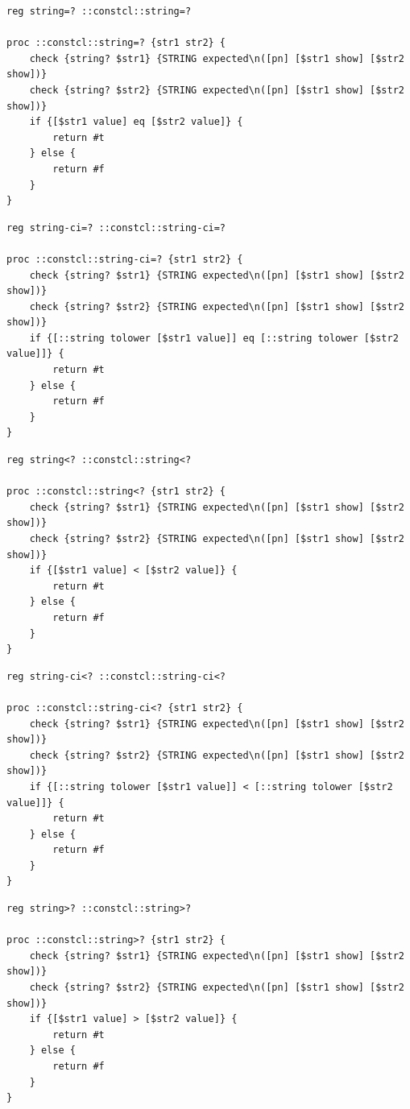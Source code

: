 \documentclass[twoside,9pt]{report}
\begin{document}
\noindent\makebox[\linewidth]{\rule{\linewidth}{0.4pt}}
\begin{lstlisting}
reg string=? ::constcl::string=?
 
proc ::constcl::string=? {str1 str2} {
    check {string? $str1} {STRING expected\n([pn] [$str1 show] [$str2 show])}
    check {string? $str2} {STRING expected\n([pn] [$str1 show] [$str2 show])}
    if {[$str1 value] eq [$str2 value]} {
        return #t
    } else {
        return #f
    }
}
\end{lstlisting}
\noindent\makebox[\linewidth]{\rule{\linewidth}{0.4pt}}
\noindent\makebox[\linewidth]{\rule{\linewidth}{0.4pt}}
\begin{lstlisting}
reg string-ci=? ::constcl::string-ci=?
 
proc ::constcl::string-ci=? {str1 str2} {
    check {string? $str1} {STRING expected\n([pn] [$str1 show] [$str2 show])}
    check {string? $str2} {STRING expected\n([pn] [$str1 show] [$str2 show])}
    if {[::string tolower [$str1 value]] eq [::string tolower [$str2 value]]} {
        return #t
    } else {
        return #f
    }
}
\end{lstlisting}
\noindent\makebox[\linewidth]{\rule{\linewidth}{0.4pt}}
\noindent\makebox[\linewidth]{\rule{\linewidth}{0.4pt}}
\begin{lstlisting}
reg string<? ::constcl::string<?
 
proc ::constcl::string<? {str1 str2} {
    check {string? $str1} {STRING expected\n([pn] [$str1 show] [$str2 show])}
    check {string? $str2} {STRING expected\n([pn] [$str1 show] [$str2 show])}
    if {[$str1 value] < [$str2 value]} {
        return #t
    } else {
        return #f
    }
}
\end{lstlisting}
\noindent\makebox[\linewidth]{\rule{\linewidth}{0.4pt}}
\noindent\makebox[\linewidth]{\rule{\linewidth}{0.4pt}}
\begin{lstlisting}
reg string-ci<? ::constcl::string-ci<?
 
proc ::constcl::string-ci<? {str1 str2} {
    check {string? $str1} {STRING expected\n([pn] [$str1 show] [$str2 show])}
    check {string? $str2} {STRING expected\n([pn] [$str1 show] [$str2 show])}
    if {[::string tolower [$str1 value]] < [::string tolower [$str2 value]]} {
        return #t
    } else {
        return #f
    }
}
\end{lstlisting}
\noindent\makebox[\linewidth]{\rule{\linewidth}{0.4pt}}
\noindent\makebox[\linewidth]{\rule{\linewidth}{0.4pt}}
\begin{lstlisting}
reg string>? ::constcl::string>?
 
proc ::constcl::string>? {str1 str2} {
    check {string? $str1} {STRING expected\n([pn] [$str1 show] [$str2 show])}
    check {string? $str2} {STRING expected\n([pn] [$str1 show] [$str2 show])}
    if {[$str1 value] > [$str2 value]} {
        return #t
    } else {
        return #f
    }
}
\end{lstlisting}
\end{document}
